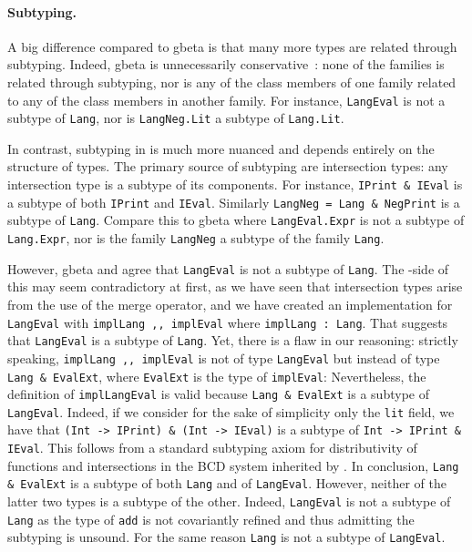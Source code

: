 \paragraph{Subtyping.}
A big difference compared to gbeta is that many more \namee types are related through
subtyping. Indeed, gbeta is unnecessarily conservative~\citep{ernst_hoh}: none of the families is related
through subtyping, nor is any of the class members of one family related to any
of the class members in another family. For instance, \lstinline{LangEval} is
not a subtype of \lstinline{Lang}, nor is \lstinline{LangNeg.Lit} a subtype
of \lstinline{Lang.Lit}.

In contrast, subtyping in \namee is much more nuanced and depends entirely on the
structure of types. The primary source of subtyping are intersection types:
any intersection type is a subtype of its components. For instance, 
\lstinline{IPrint & IEval} is a subtype of both \lstinline{IPrint} and
\lstinline{IEval}. Similarly \lstinline{LangNeg = Lang & NegPrint} is a subtype
of \lstinline{Lang}. Compare this to gbeta where \lstinline{LangEval.Expr} is
not a subtype of \lstinline{Lang.Expr}, nor is the family \lstinline{LangNeg} a
subtype of the family \lstinline{Lang}.

However, gbeta and \namee agree that \lstinline{LangEval} is not a subtype of
\lstinline{Lang}. The \namee-side of this may seem contradictory at first, as we
have seen that intersection types arise from the use of the merge operator, and
we have created an implementation for \lstinline{LangEval} with
\lstinline{implLang ,, implEval} where \lstinline{implLang : Lang}. That
suggests that \lstinline{LangEval} is a subtype of \lstinline{Lang}.
Yet, there is a flaw in our reasoning:
strictly speaking, \lstinline{implLang ,, implEval} is not of
type \lstinline{LangEval} but instead of type \lstinline{Lang & EvalExt}, where
\lstinline{EvalExt} is the type of \lstinline{implEval}:
Nevertheless, the definition of \lstinline{implLangEval} is valid because
\lstinline{Lang & EvalExt} is a subtype of \lstinline{LangEval}.
Indeed, if we consider for the sake of simplicity only the \lstinline{lit}
field, we have that \lstinline{(Int -> IPrint) & (Int -> IEval)} is a
subtype of \lstinline{Int -> IPrint & IEval}. This follows from a standard
subtyping axiom for distributivity of functions and intersections in the BCD system inherited by \namee.
In conclusion, \lstinline{Lang & EvalExt} is a subtype of both \lstinline{Lang}
and of \lstinline{LangEval}. However, neither of the latter two types is a subtype of the other.
Indeed, \lstinline{LangEval} is not a subtype of \lstinline{Lang} as the type
of \lstinline{add} is not covariantly refined and thus admitting the subtyping
is unsound. For the same reason \lstinline{Lang} is not a subtype of \lstinline{LangEval}.


